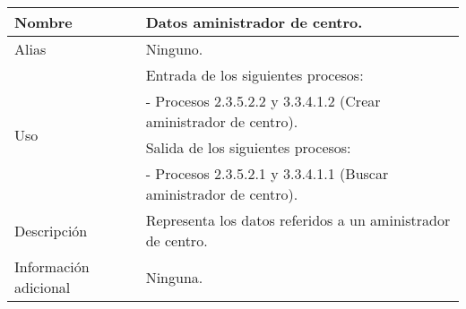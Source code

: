 \begin{center}
  \begin{tabular}{| l | p{9cm} |}
    \hline
    Nombre & \textbf{Datos aministrador de centro}.\\
    \hline
    Alias & Ninguno.\\
    \hline
    \multirow{4}{*}{Uso} & Entrada de los siguientes procesos:\\
                         & - Procesos 2.3.5.2.2 y 3.3.4.1.2 (Crear aministrador de centro).\\
                         & Salida de los siguientes procesos:\\
                         & - Procesos 2.3.5.2.1 y 3.3.4.1.1 (Buscar aministrador de centro).\\
    \hline
    Descripción & Representa los datos referidos a un aministrador de centro.\\
    \hline
    Información adicional & Ninguna.\\
    \hline
  \end{tabular}
\end{center}
